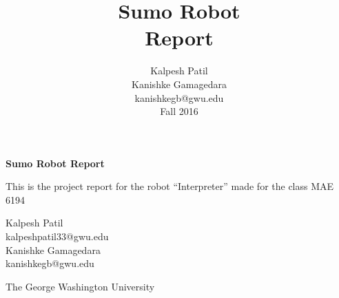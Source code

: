 \thispagestyle{empty}

\begin{center}


\vspace*{.5cm}

\title{ \bfseries Sumo Robot \\ Report}
\author{Kalpesh Patil \\ Kanishke Gamagedara\\ {\normalsize kanishkegb@gwu.edu}\\{\normalsize Fall 2016}}

\vspace{10 mm}
 {\bf \color{MidnightBlue} {\Huge Sumo Robot } \vspace{4mm} \hline  \vspace{4mm} {\Huge Report}}\\

\vspace*{6cm}

{\large This is the project report for the robot ``Interpreter'' made for the class MAE 6194 }

\vspace*{5cm}

{\large Kalpesh Patil \\ {\normalsize kalpeshpatil33@gwu.edu }\\ \vspace*{5mm} Kanishke Gamagedara}\\ 
{\normalsize kanishkegb@gwu.edu}\\\vspace*{5mm}{\large Spring 2017}

\vspace*{3cm}

{\LARGE 
The George Washington University}

\end{center}